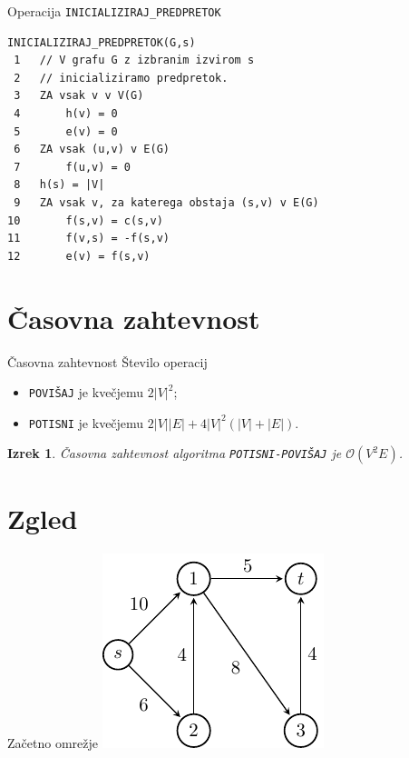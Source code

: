 \documentclass{beamer}
\newtheorem{thm}{Izrek}
\begin{document}
\begin{frame}[fragile]{Operacija \texttt{INICIALIZIRAJ\_PREDPRETOK}}
\begin{verbatim}
INICIALIZIRAJ_PREDPRETOK(G,s)
 1   // V grafu G z izbranim izvirom s
 2   // inicializiramo predpretok.
 3   ZA vsak v v V(G)
 4       h(v) = 0
 5       e(v) = 0
 6   ZA vsak (u,v) v E(G)
 7       f(u,v) = 0
 8   h(s) = |V|
 9   ZA vsak v, za katerega obstaja (s,v) v E(G)
10       f(s,v) = c(s,v)
11       f(v,s) = -f(s,v)
12       e(v) = f(s,v)
\end{verbatim}
\end{frame}


\section{Časovna zahtevnost}
\begin{frame}{Časovna zahtevnost}
    Število operacij
    \begin{itemize}
        \item \texttt{POVIŠAJ} je kvečjemu $2|V|^2$;
        \item \texttt{POTISNI} je kvečjemu $2|V||E| + 4|V|^2 (|V| + |E|)$.
    \end{itemize}
    \pause
    \begin{thm}
        Časovna zahtevnost algoritma \texttt{POTISNI-POVIŠAJ} je $\mathcal{O}(V^2E)$.
    \end{thm}
\end{frame}


\section{Zgled}
\begin{frame}{Začetno omrežje}
    \centering
    \includegraphics[scale=1.6]{../writing/images/graf2-1.pdf}
\end{frame}
\end{document}
